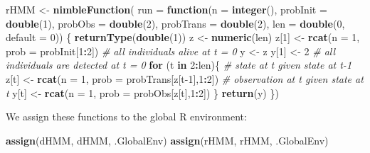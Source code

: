\documentclass[
  12pt,
]{krantz}
\newenvironment{Shaded}{\begin{snugshade}}{\end{snugshade}}
\newcommand{\AttributeTok}[1]{\textcolor[rgb]{0.13,0.29,0.53}{#1}}
\newcommand{\CommentTok}[1]{\textcolor[rgb]{0.56,0.35,0.01}{\textit{#1}}}
\newcommand{\ControlFlowTok}[1]{\textcolor[rgb]{0.13,0.29,0.53}{\textbf{#1}}}
\newcommand{\DecValTok}[1]{\textcolor[rgb]{0.00,0.00,0.81}{#1}}
\newcommand{\FunctionTok}[1]{\textcolor[rgb]{0.13,0.29,0.53}{\textbf{#1}}}
\newcommand{\NormalTok}[1]{#1}
\newcommand{\OtherTok}[1]{\textcolor[rgb]{0.56,0.35,0.01}{#1}}
\newcommand{\SpecialCharTok}[1]{\textcolor[rgb]{0.81,0.36,0.00}{\textbf{#1}}}
\newcommand{\StringTok}[1]{\textcolor[rgb]{0.31,0.60,0.02}{#1}}
\begin{document}
\begin{Shaded}
\begin{Highlighting}[]
\NormalTok{rHMM }\OtherTok{\textless{}{-}} \FunctionTok{nimbleFunction}\NormalTok{(}
  \AttributeTok{run =} \ControlFlowTok{function}\NormalTok{(}\AttributeTok{n =} \FunctionTok{integer}\NormalTok{(),}
                 \AttributeTok{probInit =} \FunctionTok{double}\NormalTok{(}\DecValTok{1}\NormalTok{),}
                 \AttributeTok{probObs =} \FunctionTok{double}\NormalTok{(}\DecValTok{2}\NormalTok{),}
                 \AttributeTok{probTrans =} \FunctionTok{double}\NormalTok{(}\DecValTok{2}\NormalTok{),}
                 \AttributeTok{len =} \FunctionTok{double}\NormalTok{(}\DecValTok{0}\NormalTok{, }\AttributeTok{default =} \DecValTok{0}\NormalTok{)) \{}
    \FunctionTok{returnType}\NormalTok{(}\FunctionTok{double}\NormalTok{(}\DecValTok{1}\NormalTok{))}
\NormalTok{    z }\OtherTok{\textless{}{-}} \FunctionTok{numeric}\NormalTok{(len)}
\NormalTok{    z[}\DecValTok{1}\NormalTok{] }\OtherTok{\textless{}{-}} \FunctionTok{rcat}\NormalTok{(}\AttributeTok{n =} \DecValTok{1}\NormalTok{, }\AttributeTok{prob =}\NormalTok{ probInit[}\DecValTok{1}\SpecialCharTok{:}\DecValTok{2}\NormalTok{]) }\CommentTok{\# all individuals alive at t = 0}
\NormalTok{    y }\OtherTok{\textless{}{-}}\NormalTok{ z}
\NormalTok{    y[}\DecValTok{1}\NormalTok{] }\OtherTok{\textless{}{-}} \DecValTok{2} \CommentTok{\# all individuals are detected at t = 0}
    \ControlFlowTok{for}\NormalTok{ (t }\ControlFlowTok{in} \DecValTok{2}\SpecialCharTok{:}\NormalTok{len)\{}
      \CommentTok{\# state at t given state at t{-}1}
\NormalTok{      z[t] }\OtherTok{\textless{}{-}} \FunctionTok{rcat}\NormalTok{(}\AttributeTok{n =} \DecValTok{1}\NormalTok{, }\AttributeTok{prob =}\NormalTok{ probTrans[z[t}\DecValTok{{-}1}\NormalTok{],}\DecValTok{1}\SpecialCharTok{:}\DecValTok{2}\NormalTok{]) }
      \CommentTok{\# observation at t given state at t}
\NormalTok{      y[t] }\OtherTok{\textless{}{-}} \FunctionTok{rcat}\NormalTok{(}\AttributeTok{n =} \DecValTok{1}\NormalTok{, }\AttributeTok{prob =}\NormalTok{ probObs[z[t],}\DecValTok{1}\SpecialCharTok{:}\DecValTok{2}\NormalTok{]) }
\NormalTok{    \}}
    \FunctionTok{return}\NormalTok{(y)}
\NormalTok{  \})}
\end{Highlighting}
\end{Shaded}

We assign these functions to the global R environment:

\begin{Shaded}
\begin{Highlighting}[]
\FunctionTok{assign}\NormalTok{(}\StringTok{\textquotesingle{}dHMM\textquotesingle{}}\NormalTok{, dHMM, .GlobalEnv)}
\FunctionTok{assign}\NormalTok{(}\StringTok{\textquotesingle{}rHMM\textquotesingle{}}\NormalTok{, rHMM, .GlobalEnv)}
\end{Highlighting}
\end{Shaded}
\end{document}
